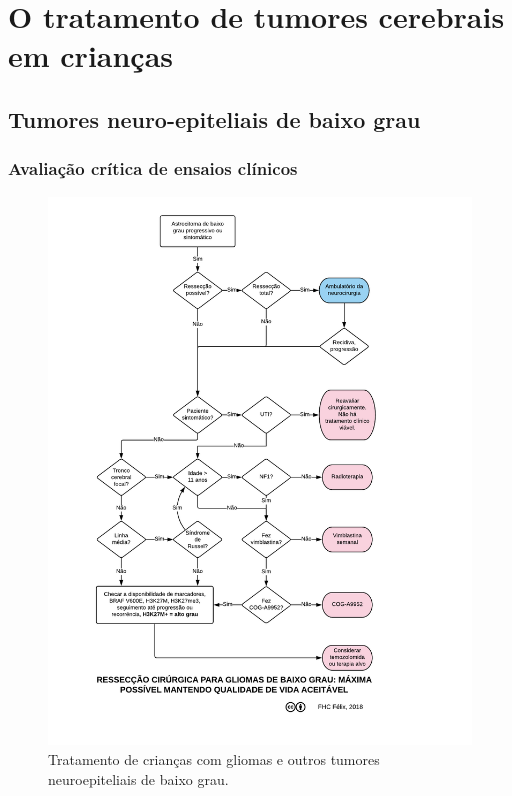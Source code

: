 \documentclass[11pt,a4paper,oldfontcommands]{memoir}
\begin{document}
\chapter{O tratamento de tumores cerebrais em crianças}

\section{Tumores neuro-epiteliais de baixo grau}

\subsection{Avaliação crítica de ensaios clínicos}
\begin{figure}[!htb]
\includegraphics[scale=0.86,trim = 18mm 0mm 15mm 5mm,clip]{fig/fig3.pdf}
\caption{Tratamento de crianças com gliomas e outros tumores neuroepiteliais de baixo grau.}
\end{figure}
\end{document}
